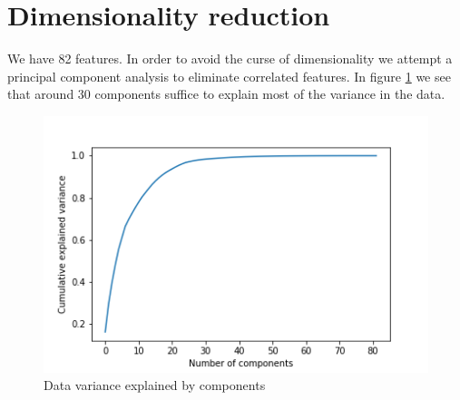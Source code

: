 \documentclass[11pt,amsmath,amssymb]{article}
\begin{document}
\section{Dimensionality reduction}
We have 82 features. In order to avoid the curse of dimensionality we attempt a principal component analysis to eliminate correlated features. In figure \ref{fig:Variance} we see that around 30 components suffice to explain most of the variance in the data.
\begin{figure}
	\centering
	\includegraphics[width=0.8\columnwidth]{variance.png}
	\caption{Data variance explained by components}
	\label{fig:Variance}
\end{figure}
\end{document}
